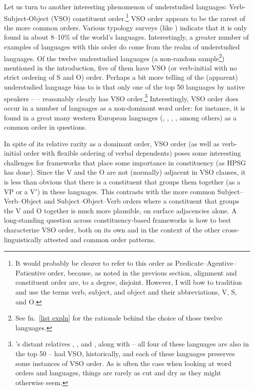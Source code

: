 \documentclass[output=paper
	        ,collection
	        ,collectionchapter
 	        ,biblatex
                ,babelshorthands
                ,newtxmath
                ,draftmode
                ,colorlinks, citecolor=brown
]{langscibook}
\begin{document}
Let us turn to another interesting phenomenon of understudied languages: Verb-Subject-Object (VSO) constituent order.\footnote{It would probably be clearer to refer to this order as Predicate--Agentive--Patientive order, because, as noted in the previous section, alignment and constituent order are, to a degree, disjoint. However, I will bow to tradition and use the terms verb, subject, and object and their abbreviations, V, S, and O.} VSO order appears to be the rarest of the more common orders. Various typology surveys (like \citealt{dryerWALSwordorder}) indicate that it is only found in about 8--10\% of the world's languages. Interestingly, a greater number of examples of languages with this order do come from the realm of understudied languages. Of the twelve understudied languages (a non-random sample\footnote{See fn.~\ref{list expln} for the rationale behind the choice of those twelve languages.}) mentioned in the introduction, five of them have VSO (or verb-initial with no strict ordering of S and O) order. Perhaps a bit more telling of the (apparent) understudied language bias to  is that only one of the top 50 languages by native speakers --  -- reasonably clearly has VSO order.\footnote{'s distant  relatives , , and , along with  -- all four of these languages are also in the top 50 -- had VSO, historically, and each of these languages preserves some instances of VSO order. As is often the case when looking at word orders and languages, things are rarely as cut and dry as they might otherwise seem.} Interestingly, VSO order does occur in a number of languages as a non-dominant word order: for instance, it is found in a great many western European languages (, , , , among others) as a common order in questions. 

In spite of its relative rarity as a dominant order, VSO order (as well as verb-initial order with flexible ordering of verbal dependents) poses some interesting challenges for frameworks that place some importance in constituency (as HPSG has done). Since the V and the O are not (normally) adjacent in VSO clauses, it is less than obvious that there is a constituent that groups them together (as a VP or a V$'$) in these languages. This contrasts with the more common Subject--Verb--Object and Subject--Object--Verb orders where a constituent that groups the V and O together is much more plausible, on surface adjacencies alone. A long-standing question across constituency-based frameworks is how to best characterize VSO order, both on its own and in the context of the other cross-linguistically attested and common order patterns.  
\end{document}
